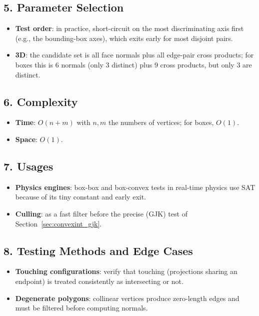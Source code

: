 \subsection{5. Parameter Selection}

\begin{itemize}
\item \textbf{Test order}: in practice, short-circuit on the most
  discriminating axis first (e.g., the bounding-box axes), which exits early
  for most disjoint pairs.
\item \textbf{3D}: the candidate set is all face normals plus all
  edge-pair cross products; for boxes this is 6 normals (only 3 distinct)
  plus 9 cross products, but only 3 are distinct.
\end{itemize}

\subsection{6. Complexity}

\begin{itemize}
\item \textbf{Time}: $O(n + m)$ with $n, m$ the numbers of vertices; for
  boxes, $O(1)$.
\item \textbf{Space}: $O(1)$.
\end{itemize}

\subsection{7. Usages}

\begin{itemize}
\item \textbf{Physics engines}: box-box and box-convex tests in real-time
  physics use SAT because of its tiny constant and early exit.
\item \textbf{Culling}: as a fast filter before the precise (GJK) test of
  Section~\ref{sec:convexint_gjk}.
\end{itemize}

\subsection{8. Testing Methods and Edge Cases}

\begin{itemize}
\item \textbf{Touching configurations}: verify that touching (projections
  sharing an endpoint) is treated consistently as intersecting or not.
\item \textbf{Degenerate polygons}: collinear vertices produce zero-length
  edges and must be filtered before computing normals.
\end{itemize}

